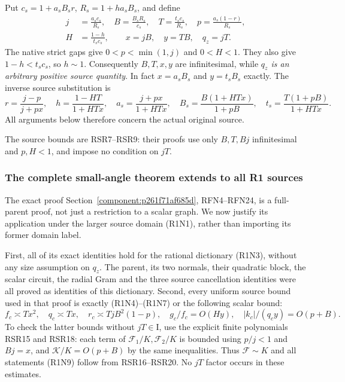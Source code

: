 Put $c_s=1+a_sB_sr$, $R_s=1+ha_sB_s$, and define
\[
\begin{aligned}
 j&=\frac{a_sc_s}{R_s},\quad B=\frac{B_sR_s}{c_s},\quad
 T=\frac{t_sc_s}{R_s},\quad p=\frac{a_s(1-r)}{R_s},\\
 H&=\frac{1-h}{t_sc_s},\qquad x=jB,\quad y=TB,\quad q_z=jT.
\end{aligned}                                          \tag{R1N2}
\]
The native strict gaps give $0<p<\min(1,j)$ and $0<H<1$.
They also give $1-h<t_sc_s$, so $h\sim1$.
Consequently $B,T,x,y$ are infinitesimal, while
\emph{$q_z$ is an arbitrary positive source quantity}.
In fact $x=a_sB_s$ and $y=t_sB_s$ exactly.
The inverse source substitution is
\[
 r=\frac{j-p}{j+px},\quad h=\frac{1-HT}{1+HTx},\quad
 a_s=\frac{j+px}{1+HTx},\quad
 B_s=\frac{B(1+HTx)}{1+pB},\quad
 t_s=\frac{T(1+pB)}{1+HTx}.                             \tag{R1N3}
\]
All arguments below therefore concern the actual original source.

The source bounds are RSR7--RSR9: their proofs use only $B,T,Bj$ infinitesimal and $p,H<1$, and impose no condition on $jT$.

\subsubsection*{The complete small-angle theorem extends to all R1 sources}

The exact proof Section~\ref{component:p261f71af685d}, RFN4--RFN24,
is a full-parent proof, not just a restriction to a scalar graph.
We now justify its application under the larger source domain
(R1N1), rather than importing its former domain label.

First, all of its exact identities hold for the rational dictionary
(R1N3), without any size assumption on $q_z$.  The parent, its two
normals, their quadratic block, the scalar circuit, the radial Gram
and the three source cancellation identities were all proved as
identities of this dictionary.  Second, every uniform source bound
used in that proof is exactly (R1N4)--(R1N7) or the following scalar
bound:
\[
 f_c\asymp Tx^2,\quad q_c\asymp Tx,\quad
 r_c\asymp TjB^2(1-p),\quad
 g_c/f_c=O(Hy),\quad |k_c|/(q_cy)=O(p+B).                \tag{R1N9}
\]
To check the latter bounds without $jT\in\mathrm I$, use the explicit
finite polynomials RSR15 and RSR18: each term of
$\mathcal F_1/K,\mathcal F_2/K$ is bounded using $p/j<1$
and $Bj=x$, and $\mathcal K/K=O(p+B)$ by the same inequalities.
Thus $\mathcal F\sim K$ and all statements (R1N9) follow from
RSR16--RSR20.  No $jT$ factor occurs in these estimates.

